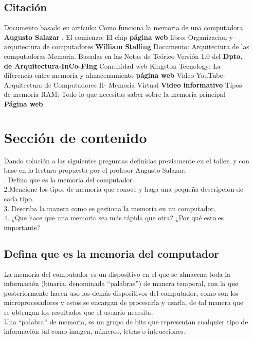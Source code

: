 \documentclass{article}
\begin{document}
\subsection{Citación}
Documento basado en artículo: Como funciona la memoria de una computadora \textbf{Augusto Salazar} \cite{Salazar}.
El comienzo: El chip \textbf{página web}
\cite{website}
libro: Organizacion y arquitectura de computadores \textbf{William Stalling} \cite{Stalling}
Documento: Arquitectura de las computadoras-Memoria. Basadas en las Notas de Teórico Versión 1.0 del \textbf{Dpto. de Arquitectura-InCo-FIng}\cite{document}
Comunidad web Kingston Tecnology: La diferencia entre memoria y almacenamiento \textbf{página web} \cite{Communitywebsite}
Video YouTube: Arquitectura de Computadores II- Memoria Virtual \textbf{Video informativo} \cite{Youtubevideo}
Tipos de memoria RAM: Todo lo que necesitas saber sobre la memoria principal \textbf{Página web} \cite{documentweb}

\section{Sección de contenido} \label{contenido}
Dando solución a las siguientes preguntas definidas previamente en el taller, y con base en la lectura propuesta por el profesor Augusto Salazar:\\

%
. Defina que es la memoria del computador.\\
2.Mencione los tipos de memoria que conoce y haga una pequeña descripción de cada tipo.\\
3. Describa la manera como se gestiona la memoria en un computador.\\
4. ¿Que hace que una memoria sea más rápida que otra? ¿Por qué esto es importante?\\


\subsection{Defina que es la memoria del computador}
%

La memoria del computador es un dispositivo en el que se almacena toda la información (binaria, denominada ``palabras'') de manera temporal, con la que posteriormente hacen uso los demás dispositivos del computador, como son los microprocesadores y estos se encargan de procesarla y usarla, de tal manera que se obtengan los resultados que el usuario necesita.\\
\noindent
Una ``palabra'' de memoria, es un grupo de bits que representan cualquier tipo de información tal como imagen, números, letras o intrucciones.\\
\end{document}
